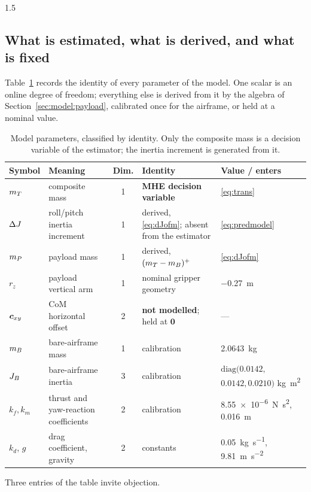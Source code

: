 \begin{spacing}{1.5}
\subsection{What is estimated, what is derived, and what is fixed}\label{sec:model:whynot}

Table~\ref{tab:params} records the identity of every parameter of the model. One
scalar is an online degree of freedom; everything else is derived from it by the
algebra of Section~\ref{sec:model:payload}, calibrated once for the airframe, or
held at a nominal value.

\begin{table}[ht]
\caption{Model parameters, classified by identity. Only the composite mass is a
decision variable of the estimator; the inertia increment is generated from it.}
\label{tab:params}
\centering
\footnotesize
\begin{tabular}{@{}l p{} c p{} p{}@{}}
\toprule
Symbol & Meaning & Dim. & Identity & Value / enters \\
\midrule
$m_T$ & composite mass & 1 & \textbf{MHE decision variable} & \eqref{eq:trans} \\
\midrule
$\Delta J$ & roll/pitch inertia increment & 1 & derived, \eqref{eq:dJofm}; absent from the estimator & \eqref{eq:predmodel} \\
$m_P$ & payload mass & 1 & derived, $(m_T-m_B)^{+}$ & \eqref{eq:dJofm} \\
\midrule
$r_z$ & payload vertical arm & 1 & nominal gripper geometry & \SI{-0.27}{\meter} \\
$\bm{c}_{xy}$ & CoM horizontal offset & 2 & \textbf{not modelled}; held at $\bm 0$ & --- \\
\midrule
$m_B$ & bare-airframe mass & 1 & calibration & \SI{2.0643}{\kg} \\
$J_B$ & bare-airframe inertia & 3 & calibration & $\mathrm{diag}(0.0142,$ $0.0142, 0.0210)$ \si{\kg\meter\squared} \\
$k_f, k_m$ & thrust and yaw-reaction coefficients & 2 & calibration & \SI{8.55e-6}{\newton\second\squared}, \SI{0.016}{\meter} \\
$k_d$, $g$ & drag coefficient, gravity & 2 & constants & \SI{0.05}{\kg\per\second}, \SI{9.81}{\meter\per\second\squared} \\
\bottomrule
\end{tabular}
\end{table}

Three entries of the table invite objection.


\end{spacing}

